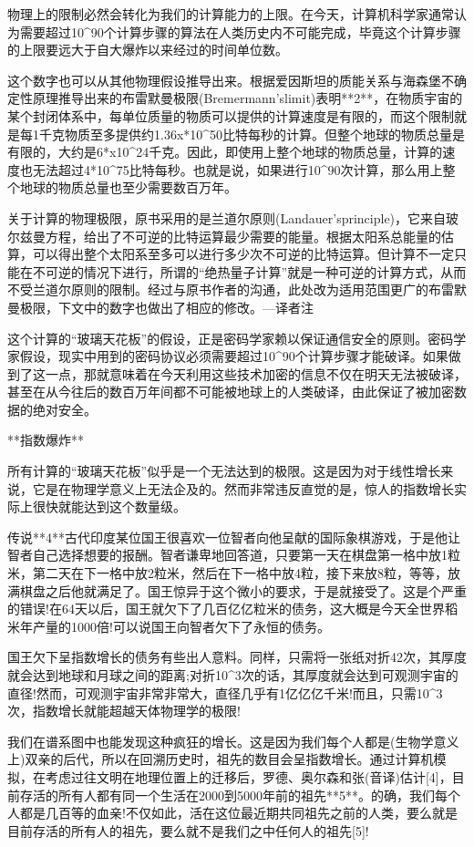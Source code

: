 物理上的限制必然会转化为我们的计算能力的上限。在今天，计算机科学家通常认为需要超过10^90个计算步骤的算法在人类历史内不可能完成，毕竟这个计算步骤的上限要远大于自大爆炸以来经过的时间单位数。

这个数字也可以从其他物理假设推导出来。根据爱因斯坦的质能关系与海森堡不确定性原理推导出来的布雷默曼极限(Bremermann'slimit)表明**2**，在物质宇宙的某个封闭体系中，每单位质量的物质可以提供的计算速度是有限的，而这个限制就是每1千克物质至多提供约1.36x*10^50比特每秒的计算。但整个地球的物质总量是有限的，大约是6*x10^24千克。因此，即使用上整个地球的物质总量，计算的速度也无法超过4*10^75比特每秒。也就是说，如果进行10^90次计算，那么用上整个地球的物质总量也至少需要数百万年。

关于计算的物理极限，原书采用的是兰道尔原则(Landauer'sprinciple)，它来自玻尔兹曼方程，给出了不可逆的比特运算最少需要的能量。根据太阳系总能量的估算，可以得出整个太阳系至多可以进行多少次不可逆的比特运算。但计算不一定只能在不可逆的情况下进行，所谓的“绝热量子计算”就是一种可逆的计算方式，从而不受兰道尔原则的限制。经过与原书作者的沟通，此处改为适用范围更广的布雷默曼极限，下文中的数字也做出了相应的修改。---译者注

这个计算的“玻璃天花板”的假设，正是密码学家赖以保证通信安全的原则。密码学家假设，现实中用到的密码协议必须需要超过10^90个计算步骤才能破译。如果做到了这一点，那就意味着在今天利用这些技术加密的信息不仅在明天无法被破译，甚至在从今往后的数百万年间都不可能被地球上的人类破译，由此保证了被加密数据的绝对安全。

**指数爆炸**

所有计算的“玻璃天花板”似乎是一个无法达到的极限。这是因为对于线性增长来说，它是在物理学意义上无法企及的。然而非常违反直觉的是，惊人的指数增长实际上很快就能达到这个数量级。

传说**4**古代印度某位国王很喜欢一位智者向他呈献的国际象棋游戏，于是他让智者自己选择想要的报酬。智者谦卑地回答道，只要第一天在棋盘第一格中放1粒米，第二天在下一格中放2粒米，然后在下一格中放4粒，接下来放8粒，等等，放满棋盘之后他就满足了。国王惊异于这个微小的要求，于是就接受了。这是个严重的错误!在64天以后，国王就欠下了几百亿亿粒米的债务，这大概是今天全世界稻米年产量的1000倍!可以说国王向智者欠下了永恒的债务。

国王欠下呈指数增长的债务有些出人意料。同样，只需将一张纸对折42次，其厚度就会达到地球和月球之间的距离;对折10^3次的话，其厚度就会达到可观测宇宙的直径!然而，可观测宇宙非常非常大，直径几乎有1亿亿亿千米!而且，只需10^3次，指数增长就能超越天体物理学的极限!

我们在谱系图中也能发现这种疯狂的增长。这是因为我们每个人都是(生物学意义上)双亲的后代，所以在回溯历史时，祖先的数目会呈指数增长。通过计算机模拟，在考虑过往文明在地理位置上的迁移后，罗德、奥尔森和张(音译)估计[4]，目前存活的所有人都有同一个生活在2000到5000年前的祖先**5**。的确，我们每个人都是几百等的血亲!不仅如此，活在这位最近期共同祖先之前的人类，要么就是目前存活的所有人的祖先，要么就不是我们之中任何人的祖先[5]!

